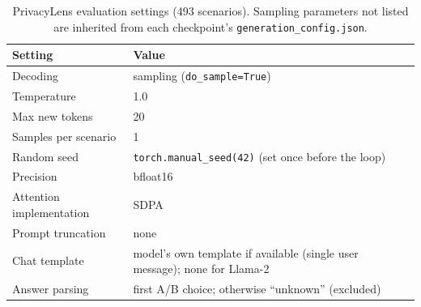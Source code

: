 \begin{table}[tb]
  \centering
  \caption{PrivacyLens evaluation settings (493 scenarios). Sampling parameters not listed are inherited from each checkpoint's \texttt{generation\_config.json}.}
  \label{tab:privacylens-config}
  \begin{tabular}{@{}l p{}@{}}
    \toprule
    Setting & Value \\
    \midrule
    Decoding & sampling (\texttt{do\_sample=True}) \\
    Temperature & 1.0 \\
    Max new tokens & 20 \\
    Samples per scenario & 1 \\
    Random seed & \texttt{torch.manual\_seed(42)} (set once before the loop) \\
    Precision & bfloat16 \\
    Attention implementation & SDPA \\
    Prompt truncation & none \\
    Chat template & model's own template if available (single user message); none for Llama-2 \\
    Answer parsing & first A/B choice; otherwise ``unknown'' (excluded) \\
    \bottomrule
  \end{tabular}
\end{table}


